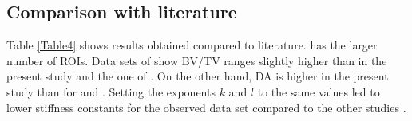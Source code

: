 \documentclass[a4paper,fleqn]{DC_ArtStyle}
\begin{document}
\subsection{Comparison with literature}
Table \ref{Table4} shows results obtained compared to literature. \citeauthor{Gross2013} \cite{Gross2013} has the larger number of ROIs. Data sets of \citeauthor{Panyasantisuk2015} \cite{Panyasantisuk2015} show BV/TV ranges slightly higher than in the present study and the one of \citeauthor{Gross2013} \cite{Gross2013}. On the other hand, DA is higher in the present study than for \citeauthor{Panyasantisuk2015} \cite{Panyasantisuk2015} and \citeauthor{Gross2013} \cite{Gross2013}. Setting the exponents $k$ and $l$ to the same values led to lower stiffness constants for the observed data set compared to the other studies \cite{Gross2013,Panyasantisuk2015}.\\
\end{document}
